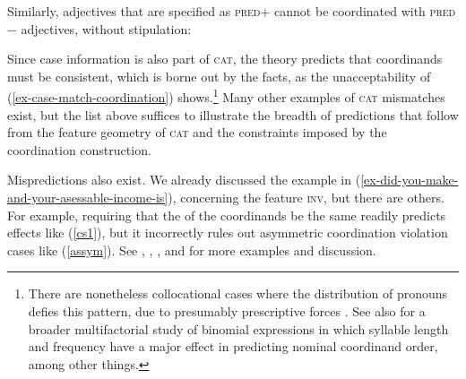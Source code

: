 \eal
\label{pp2}

\zl

Similarly, adjectives that are specified as \textsc{pred}$+$ cannot be
coordinated with  \textsc{pred}$-$ adjectives, without stipulation:

\eal
{}
\zl

\largerpage
\noindent
Since case information is also part of \textsc{cat},  the theory
predicts that coordinands must be consistent, which is borne out by the
facts, as the unacceptability of  (\ref{ex-case-match-coordination}) shows.\footnote{There are nonetheless collocational cases where the distribution of pronouns defies this pattern, due to presumably prescriptive forces \citep{grano}. See also \citet[105, 107]{binomial} for a broader multifactorial study of binomial expressions in which syllable length and  frequency have a major effect in predicting nominal coordinand order, among other things.}
 Many other examples of \textsc{cat} mismatches exist, but the  list above suffices to
illustrate the breadth of predictions that follow from the feature geometry of \textsc{cat} and the constraints imposed by
the coordination construction.

\eal
\label{ex-case-match-coordination}
\zl




Mispredictions also exist. We already discussed the example in (\ref{ex-did-you-make-and-your-asessable-income-is}), concerning the feature \textsc{inv}, but there are others. For example, requiring that the \slashv of the coordinands be the same readily predicts  effects like 
(\ref{cs1}), but it incorrectly rules out asymmetric coordination violation cases like (\ref{assym}). 
See \citet{goldsmith}, \citet{lakoff86}, \citet{levinprince86}, and \citet{kehler} for more examples and discussion.


\eal
\label{cs1}


